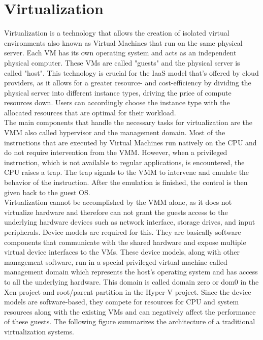 \section{Virtualization}
Virtualization is a technology that allows the creation of isolated virtual environments also known as 
Virtual Machines that run on the same physical server. Each VM has its own operating system and acts as 
an independent physical computer. These VMs are called "guests" and the physical server is called "host". 
This technology is crucial for the \ac{IaaS} model that's offered by cloud providers, 
as it allows for a greater resource- and cost-efficiency by dividing the physical server into different 
instance types, driving the price of compute resources down. Users can accordingly choose the instance type 
with the allocated resources that are optimal for their workload. \\
The main components that handle the necessary tasks for virtualization are the \ac{VMM} 
also called hypervisor and the management domain. Most of the instructions that are executed by Virtual 
Machines run natively on the CPU and do not require intervention from the \acs{VMM}. However, when a privileged 
instruction, which is not available to regular applications, is encountered, the CPU raises a trap. 
The trap signals to the \acs{VMM} to intervene and emulate the behavior of the instruction.  After the emulation 
is finished, the control is then given back to the guest OS. \\
Virtualization cannot be accomplished by the VMM alone, as it does not virtualize hardware and therefore 
can not grant the guests access to the underlying hardware devices such as network interface, storage drives, 
and input peripherals. Device models are required for this. They are basically software components that 
communicate with the shared hardware and expose multiple virtual device interfaces to the VMs. These 
device models, along with other management software, run in a special privileged virtual machine called 
management domain which represents the host's operating system and has access to all the underlying hardware. 
This domain is called domain zero or dom0 in the Xen project and root/parent partition in the Hyper-V project. 
Since the device models are software-based, they compete for resources for CPU and system resources along 
with the existing VMs and can negatively affect the performance of these guests. 
The following figure summarizes the architecture of a traditional virtualization systems. 
